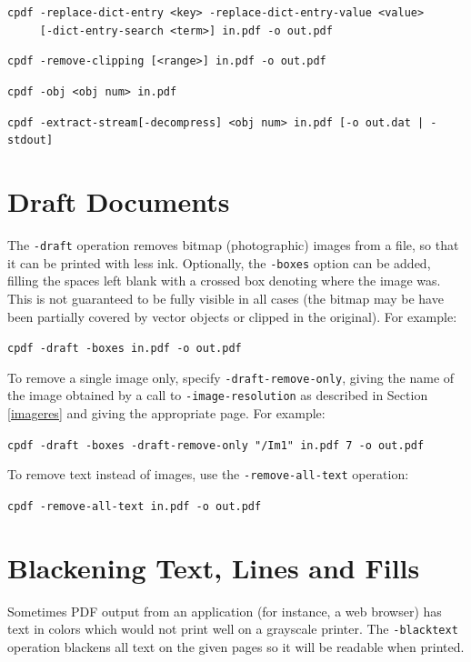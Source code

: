 \documentclass{book}
\begin{document}
{\begin{framed}
  \vspace{1.5mm}
  \noindent\verb!cpdf -replace-dict-entry <key> -replace-dict-entry-value <value>!\\
  \noindent\verb!     [-dict-entry-search <term>] in.pdf -o out.pdf!

  \vspace{1.5mm}
  \noindent\verb!cpdf -remove-clipping [<range>] in.pdf -o out.pdf!

  \vspace{1.5mm}
  \noindent\verb!cpdf -obj <obj num> in.pdf!

  \vspace{1.5mm}
  \noindent\verb!cpdf -extract-stream[-decompress] <obj num> in.pdf [-o out.dat | -stdout]!
  \end{framed}}
  \section{Draft Documents}
\label{draft}
    The \texttt{-draft} operation removes bitmap (photographic) images from a
file, so that it can be printed with less ink. Optionally, the
\texttt{-boxes} option can be added, filling the spaces left blank with a
crossed box denoting where the image was. This is not guaranteed to be fully
visible in all cases (the bitmap may be have been partially covered by vector
objects or clipped in the original). For example:
  \begin{framed}
    \noindent\small\verb!cpdf -draft -boxes in.pdf -o out.pdf!
  \end{framed}

\noindent To remove a single image only, specify \texttt{-draft-remove-only}, giving the name of the image obtained by a call to \texttt{-image-resolution} as described in Section \ref{imageres} and giving the appropriate page. For example:

  \begin{framed}
    \noindent\small\verb!cpdf -draft -boxes -draft-remove-only "/Im1" in.pdf 7 -o out.pdf!
  \end{framed}

\noindent To remove text instead of images, use the \texttt{-remove-all-text} operation:

  \begin{framed}
    \noindent\small\verb!cpdf -remove-all-text in.pdf -o out.pdf!
  \end{framed}

  \section{Blackening Text, Lines and Fills}
  Sometimes PDF output from an application (for instance, a web browser) has
text in colors which would not print well on a grayscale printer. The
\texttt{-blacktext} operation blackens all text on the given pages so it will be readable
when printed.
\end{document}
